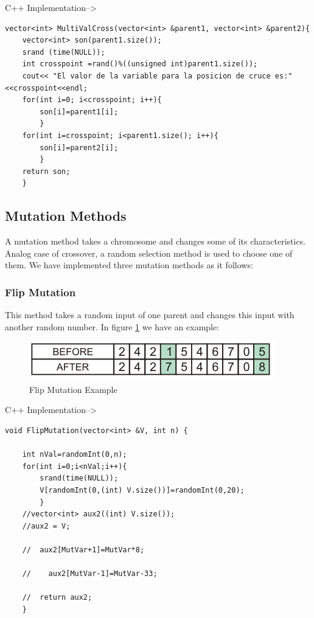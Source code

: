 \documentclass[letterpaper]{article}
\begin{document}
\bigskip
\bigskip
C++ Implementation-->
\bigskip
\bigskip



\lstset{language=C++}
\begin{lstlisting}
vector<int> MultiValCross(vector<int> &parent1, vector<int> &parent2){
	vector<int> son(parent1.size());
	srand (time(NULL));
	int crosspoint =rand()%((unsigned int)parent1.size());
	cout<< "El valor de la variable para la posicion de cruce es:"<<crosspoint<<endl;
	for(int i=0; i<crosspoint; i++){
		son[i]=parent1[i];
		}
	for(int i=crosspoint; i<parent1.size(); i++){
		son[i]=parent2[i];
		}
	return son;
	}
\end{lstlisting}


\subsection{Mutation Methods}

A mutation method takes a chromosome and changes some of its characteristics. Analog case of crossover, a random selection method is used to choose one of them. We have implemented three mutation methods as it follows:

\subsubsection{Flip Mutation}

This method takes a random input of one parent and changes this input with another random number. In figure \ref{F:flip} we have an example:

\begin{figure}[h]
\centering
\includegraphics[width=0.7\linewidth]{images/flipmutation.png}
\caption{Flip Mutation Example}
\label{F:flip}
\end{figure}


\bigskip
\bigskip
C++ Implementation-->
\bigskip
\bigskip



\lstset{language=C++}
\begin{lstlisting}
void FlipMutation(vector<int> &V, int n) {
	
	int nVal=randomInt(0,n);
	for(int i=0;i<nVal;i++){
		srand(time(NULL));
		V[randomInt(0,(int) V.size())]=randomInt(0,20);
		}
	//vector<int> aux2((int) V.size());
	//aux2 = V;
	
	//	aux2[MutVar+1]=MutVar*8;
		
    //    aux2[MutVar-1]=MutVar-33;
		
	//	return aux2;
	}

\end{lstlisting}
\end{document}
